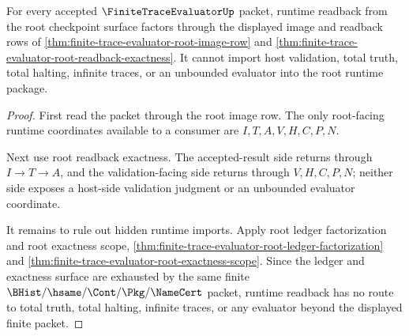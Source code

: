 \begin{theorem}
\label{thm:finite-trace-evaluator-root-runtime-readback-nonescape}
For every accepted $\FiniteTraceEvaluatorUp$ packet, runtime readback from the
root checkpoint surface factors through the displayed image and readback rows
of \autoref{thm:finite-trace-evaluator-root-image-row} and
\autoref{thm:finite-trace-evaluator-root-readback-exactness}. It cannot import
host validation, total truth, total halting, infinite traces, or an unbounded
evaluator into the root runtime package.
\end{theorem}
\begin{proof}
First read the packet through the root image row. The only root-facing runtime
coordinates available to a consumer are $I,T,A,V,H,C,P,N$.

Next use root readback exactness. The accepted-result side returns through
$I \to T \to A$, and the validation-facing side returns through
$V,H,C,P,N$; neither side exposes a host-side validation judgment or an
unbounded evaluator coordinate.

It remains to rule out hidden runtime imports. Apply root ledger factorization
and root exactness scope,
\autoref{thm:finite-trace-evaluator-root-ledger-factorization} and
\autoref{thm:finite-trace-evaluator-root-exactness-scope}. Since the ledger
and exactness surface are exhausted by the same finite
$\BHist/\hsame/\Cont/\Pkg/\NameCert$ packet, runtime readback has no route to
total truth, total halting, infinite traces, or any evaluator beyond the
displayed finite packet.
\end{proof}

